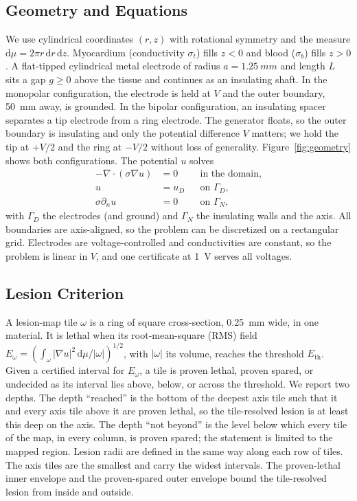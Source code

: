 \documentclass[11pt]{article}
\newcommand{\dmu}{\,\mathrm{d}\mu}
\begin{document}
\subsection{Geometry and Equations}

We use cylindrical coordinates $(r,z)$ with rotational symmetry and the measure
$\mathrm{d}\mu = 2\pi r\,\mathrm{d}r\,\mathrm{d}z$. Myocardium (conductivity
$\sigma_t$) fills $z<0$ and blood ($\sigma_b$) fills $z>0$. A flat-tipped
cylindrical metal electrode of radius $a=\SI{1.25}{mm}$ and length $L$ sits a
gap $g\ge0$ above the tissue and continues as an insulating shaft. In the
monopolar configuration, the electrode is held at $V$ and the outer boundary,
\SI{50}{mm} away, is grounded. In the bipolar configuration, an insulating
spacer separates a tip electrode from a ring electrode. The generator floats,
so the outer boundary is insulating and only the potential difference $V$
matters; we hold the tip at $+V/2$ and the ring at $-V/2$ without loss of
generality. Figure~\ref{fig:geometry} shows both configurations. The potential $u$ solves
\begin{equation}
\begin{aligned}
-\nabla\cdot(\sigma\nabla u)&=0 &&\text{in the domain},\\
u&=u_D &&\text{on }\Gamma_D,\\
\sigma\partial_n u&= 0 &&\text{on }\Gamma_N,
\end{aligned}
\end{equation}
with $\Gamma_D$ the electrodes (and ground) and $\Gamma_N$ the insulating walls
and the axis. All boundaries are axis-aligned, so the problem can be discretized on a
rectangular grid. Electrodes are voltage-controlled and conductivities are
constant, so the problem is linear in $V$, and one certificate at \SI{1}{V}
serves all voltages.

\subsection{Lesion Criterion} A lesion-map tile $\omega$ is a ring of square
cross-section, \SI{0.25}{mm} wide, in one material. It is lethal when its
root-mean-square (RMS) field $E_\omega = (\int_\omega |\nabla u|^2\dmu/|\omega|)^{1/2}$, with $|\omega|$ its volume, reaches the
threshold $E_\mathrm{th}$. Given a certified interval for $E_\omega$, a tile is
proven lethal, proven spared, or undecided as its interval lies above, below, or
across the threshold. We report two depths. The depth
``reached'' is the bottom of the deepest axis tile such that it and every axis
tile above it are proven lethal, so the tile-resolved lesion is at least this deep on
the axis.
The depth ``not beyond'' is the level below which every tile of the map, in every
column, is proven spared; the statement is limited to the mapped region. Lesion radii are defined in the same way along each row of
tiles. The axis tiles are the smallest and carry the widest intervals. The
proven-lethal inner envelope and the proven-spared outer envelope bound the
tile-resolved lesion from inside and outside.
\end{document}
